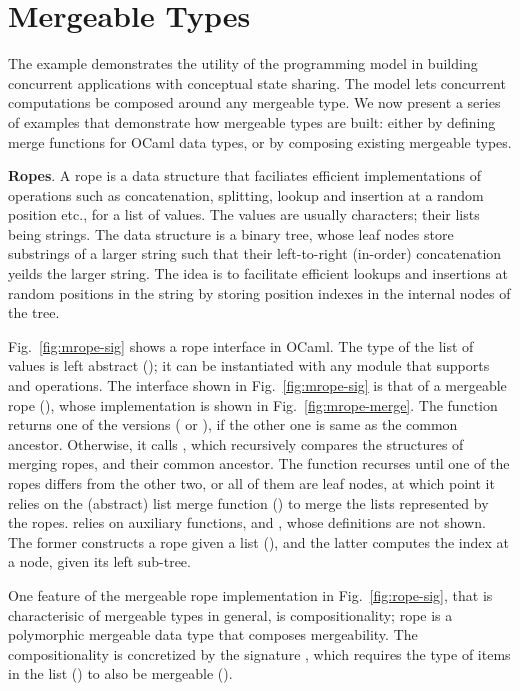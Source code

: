 \section{Mergeable Types}



The \drawsome example demonstrates the utility of the \name
programming model in building concurrent applications with conceptual
state sharing. The model lets concurrent computations be composed
around any mergeable type. We now present a series of examples that
demonstrate how mergeable types are built: either by defining merge
functions for OCaml data types, or by composing existing mergeable
types.

{\bf Ropes}. A rope is a data structure that faciliates efficient
implementations of operations such as concatenation, splitting, lookup
and insertion at a random position etc., for a list of values. The
values are usually characters; their lists being strings. The data
structure is a binary tree, whose leaf nodes store substrings of a
larger string such that their left-to-right (in-order) concatenation
yeilds the larger string. The idea is to facilitate efficient lookups
and insertions at random positions in the string by storing
position indexes in the internal nodes of the tree. 

Fig.~\ref{fig:mrope-sig} shows a rope interface in OCaml. The type of
the list of values is left abstract (); it can be instantiated
with any module that supports  and  operations. The
interface shown in Fig.~\ref{fig:mrope-sig} is that of a mergeable
rope (), whose  implementation is shown
in Fig.~\ref{fig:mrope-merge}. The function returns one of the
versions ( or ), if the other one is same as the common
ancestor. Otherwise, it calls , which recursively
compares the structures of merging ropes, and their common ancestor.
The function recurses until one of the ropes differs from the other
two, or all of them are leaf nodes, at which point it relies on the
(abstract) list merge function () to merge the lists
represented by the ropes.  relies on auxiliary
functions,  and , whose definitions are
not shown. The former constructs a rope given a list (), and
the latter computes the index at a node, given its left sub-tree.

One feature of the mergeable rope implementation in
Fig.~\ref{fig:rope-sig}, that is characterisic of mergeable types in
general, is compositionality; rope is a polymorphic mergeable data
type that composes mergeability. The compositionality is concretized
by the  signature , which requires the type of items in the
list () to also be mergeable ().

